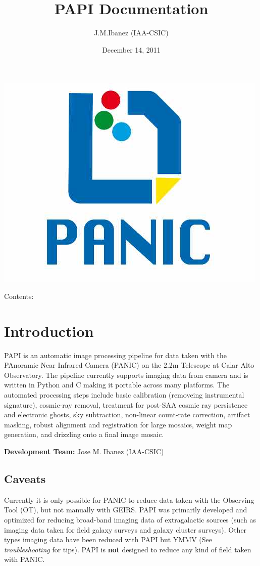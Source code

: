 \documentclass[letterpaper,10pt,english]{sphinxmanual}
\title{PAPI Documentation}
\date{December 14, 2011}
\author{J.M.Ibanez (IAA-CSIC)}
\begin{document}
\maketitle
\tableofcontents
{}\label{index::doc}


{\hfill\includegraphics{logo_PANIC.jpg}\hfill}

Contents:


\chapter{Introduction}
\label{intro:introduction}\label{intro:welcome-to-papi-s-documentation}\label{intro::doc}
PAPI is an automatic image processing pipeline for data taken with the
PAnoramic Near Infrared Camera (PANIC) on the 2.2m Telescope at Calar Alto Observatory. The pipeline
currently supports imaging data from camera and is written in Python
and C making it portable across many platforms. The automated processing
steps include basic calibration (removeing instrumental signature), cosmic-ray
removal, treatment for post-SAA cosmic ray persistence and electronic ghosts,
sky subtraction, non-linear count-rate correction,
artifact masking, robust alignment and registration for large mosaics,
weight map generation, and drizzling onto a final image mosaic.

\textbf{Development Team:} Jose M. Ibanez (IAA-CSIC)


\section{Caveats}
\label{intro:caveats}
Currently it is only possible for PANIC to reduce data taken with the
Observing Tool (OT), but not manually with GEIRS.
PAPI was primarily developed and optimized for reducing broad-band imaging data of
extragalactic sources (such as imaging data taken for field galaxy surveys and galaxy cluster surveys).
Other types imaging data have been reduced with PAPI but YMMV (See \emph{troubleshooting} for tips).
PAPI is \textbf{not} designed to reduce any kind of field taken with PANIC.
\end{document}

